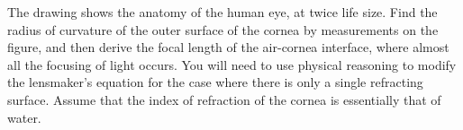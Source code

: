 The drawing shows the anatomy of the human eye, at
twice life size. Find the radius of curvature of the outer
surface of the cornea by measurements on the figure, and
then derive the focal length of the air-cornea interface,
where almost all the focusing of light occurs. You will need
to use physical reasoning to modify the lensmaker's equation
for the case where there is only a single refracting
surface. Assume that the index of refraction of the cornea
is essentially that of water.
